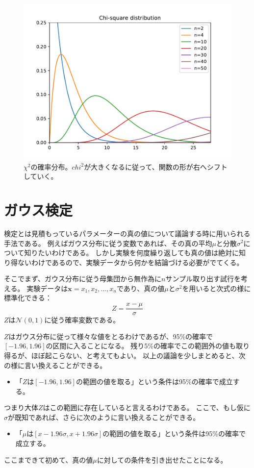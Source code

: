 \begin{figure}[h]
  \centering
  \includegraphics[scale=0.5]{python/ChiSquareDistribution.pdf}
  \caption{$\chi^2$の確率分布。$chi^2$が大きくなるに従って、関数の形が右へシフトしていく。}
\end{figure}


\section{ガウス検定}

検定とは見積もっているパラメーターの真の値について議論する時に用いられる手法である。
例えばガウス分布に従う変数であれば、その真の平均$\mu$と分散$\sigma^2$について知りたいわけである。
しかし実験を何度繰り返しても真の値は絶対に知り得ないわけであるので、実験データから何かを結論づける必要がでてくる。

そこでまず、ガウス分布に従う母集団から無作為に$n$サンプル取り出す試行を考える。
実験データは$\bm{x}={x_1,x_2,...,x_n}$であり、真の値$\mu$と$\sigma^2$を用いると次式の様に標準化できる：
\begin{equation} 
  Z = \frac{x-\mu}{\sigma}
\end{equation}
$Z$は$\mathcal{N}(0,1)$に従う確率変数である。

$Z$はガウス分布に従って様々な値をとるわけであるが、95\%の確率で$[-1.96, 1.96]$の区間に入ることになる。
残り5\%の確率でこの範囲外の値も取り得るが、ほぼ起こらない、と考えてもよい。
以上の議論を少しまとめると、次の様に言い換えることができる。
\begin{itemize}
  \item 「$Z$は$[-1.96, 1.96]$の範囲の値を取る」という条件は95\%の確率で成立する。
\end{itemize}
つまり大体$Z$はこの範囲に存在していると言えるわけである。
ここで、もし仮に$\sigma$が既知であれば、さらに次のように言い換えることができる。
\begin{itemize}
  \item 「$\mu$は$[x-1.96\sigma, x+1.96\sigma]$の範囲の値を取る」という条件は95\%の確率で成立する。
\end{itemize}
ここまできて初めて、真の値$\mu$に対しての条件を引き出せたことになる。


